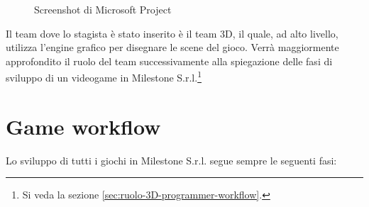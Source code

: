 \begin{figure}
	\centering
	\caption{Screenshot di Microsoft Project}
	\label{fig:screenshot-microsoft-project}
\end{figure}

Il team dove lo stagista è stato inserito è il team 3D, il quale, ad alto livello, utilizza l'engine grafico per disegnare le scene del gioco. Verrà maggiormente approfondito il ruolo del team successivamente alla spiegazione delle fasi di sviluppo di un videogame in Milestone S.r.l.\footnote{Si veda la sezione \ref{sec:ruolo-3D-programmer-workflow}.}

\section{Game workflow}

Lo sviluppo di tutti i giochi in Milestone S.r.l. segue sempre le seguenti fasi:

